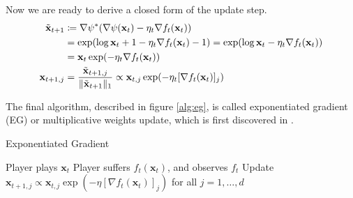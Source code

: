 \documentclass[12pt, a4paper]{report}
\begin{document}
Now we are ready to derive a closed form of the update step.
\begin{align*}
    \Tilde{\mathbf{x}}_{t+1} &\coloneqq \nabla \psi^*(\nabla \psi(\mathbf{x}_t) - \eta_t\nabla f_t(\mathbf{x}_t))
    \\
    &= \exp( \log \mathbf{x}_t + 1 - \eta_t \nabla f_t(\mathbf{x}_t) - 1) = \exp(\log \mathbf{x}_t - \eta_t \nabla f_t(\mathbf{x}_t))
    \\
    &= \mathbf{x}_t \exp(-\eta_t \nabla f_t(\mathbf{x}_t))
    \\
    \mathbf{x}_{t+1, j} &= \frac{\Tilde{\mathbf{x}}_{t+1, j}}{\lVert \Tilde{\mathbf{x}}_{t+1} \rVert_1} \propto \mathbf{x}_{t, j} \exp(-\eta_t [\nabla f_t(\mathbf{x}_t)]_j)
\end{align*}

The final algorithm, described in figure \ref{alg:eg}, is called exponentiated gradient (EG) or multiplicative weights update, which is first discovered in \cite{Kivinen1997ExponentiatedGV}.
    
\begin{algorithm}
\caption{Exponentiated Gradient} \label{alg:eg}
\begin{algorithmic}
\State Player plays $\mathbf{x}_t$
\State Player suffers $f_t(\mathbf{x}_t)$, and observes $f_t$
\State Update $\mathbf{x}_{t+1, j} \propto \mathbf{x}_{t, j}\exp(-\eta [\nabla f_t(\mathbf{x}_t)]_j)$ for all $j = 1, \dots, d$
\EndFor
\end{algorithmic}
\end{algorithm}
\end{document}
